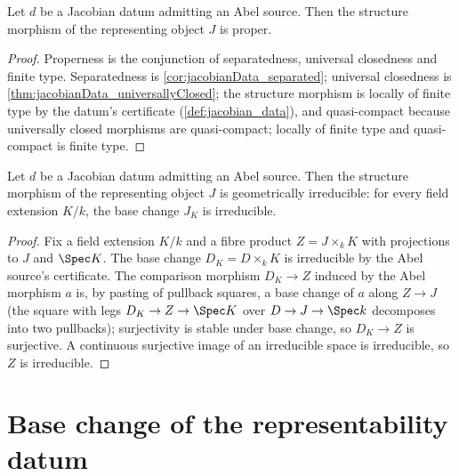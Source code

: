 \begin{theorem}
  \label{thm:jacobianData_proper}
  \leanok
  Let \(d\) be a Jacobian datum admitting an Abel source. Then the structure
  morphism of the representing object \(J\) is proper.
\end{theorem}
\begin{proof}
  \leanok
  Properness is the conjunction of separatedness, universal closedness and
  finite type. Separatedness is \ref{cor:jacobianData_separated}; universal
  closedness is \ref{thm:jacobianData_universallyClosed}; the structure morphism
  is locally of finite type by the datum's certificate
  (\ref{def:jacobian_data}), and quasi-compact because universally closed
  morphisms are quasi-compact; locally of finite type and quasi-compact is
  finite type.
\end{proof}

\begin{theorem}
  \label{thm:jacobianData_geomIrreducible}
  \leanok
  Let \(d\) be a Jacobian datum admitting an Abel source. Then the structure
  morphism of the representing object \(J\) is geometrically irreducible: for
  every field extension \(K/k\), the base change \(J_K\) is irreducible.
\end{theorem}
\begin{proof}
  \leanok
  Fix a field extension \(K/k\) and a fibre product \(Z = J \times_k K\) with
  projections to \(J\) and \(\Spec K\). The base change
  \(D_K = D \times_k K\) is irreducible by the Abel source's certificate. The
  comparison morphism \(D_K \to Z\) induced by the Abel morphism \(a\) is,
  by pasting of pullback squares, a base change of \(a\) along
  \(Z \to J\) (the square with legs \(D_K \to Z \to \Spec K\) over
  \(D \to J \to \Spec k\) decomposes into two pullbacks); surjectivity is
  stable under base change, so \(D_K \to Z\) is surjective. A continuous
  surjective image of an irreducible space is irreducible, so \(Z\) is
  irreducible.
\end{proof}

\section{Base change of the representability datum}
\label{sec:jacobian_datum_basechange}

